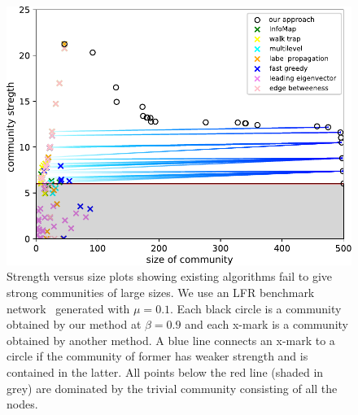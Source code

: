 \begin{figure}[t]
    \centering
    \def\svgwidth{\columnwidth}
    \fontsize{10}{10}\selectfont
    \includegraphics[width=\linewidth]{abcomm}
    \hfill
    \vspace{-.5em}
    \caption{
   		 Strength versus size plots showing existing algorithms fail to give strong communities of
		 large sizes. We use an LFR benchmark network~\cite{lancichinetti2009benchmarks} generated
		 with $\mu=0.1$. Each black circle is a community obtained by our method at $\beta = 0.9$ and
		 each {\sffamily x}-mark is a community obtained by another method.
		 A blue line connects an {\sffamily x}-mark to a circle if the community of former has weaker strength and is contained in the latter.
		 All points below the red line (shaded in grey) are dominated by the trivial community consisting of all the nodes.
    }

  \label{fig:LFR}
\end{figure}


